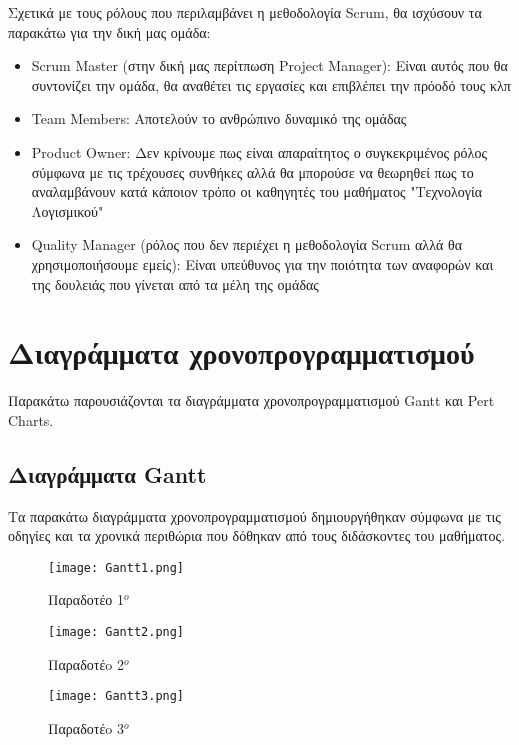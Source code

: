 \documentclass{article}
\begin{document}
Σχετικά με τους ρόλους που περιλαμβάνει η μεθοδολογία Scrum, θα ισχύσουν τα παρακάτω για την δική μας ομάδα:

\begin{itemize}
  \item Scrum Master (στην δική μας περίτπωση Project Manager): Είναι αυτός που θα συντονίζει την ομάδα, θα αναθέτει τις εργασίες και επιβλέπει την πρόοδό τους κλπ
  \item Team Members: Αποτελούν το ανθρώπινο δυναμικό της ομάδας
  \item Product Owner: Δεν κρίνουμε πως είναι απαραίτητος ο συγκεκριμένος ρόλος σύμφωνα με τις τρέχουσες συνθήκες αλλά θα μπορούσε να θεωρηθεί πως το αναλαμβάνουν κατά κάποιον τρόπο οι καθηγητές του μαθήματος "Τεχνολογία Λογισμικού"
  \item Quality Manager (ρόλος που δεν περιέχει η μεθοδολογία Scrum αλλά θα χρησιμοποιήσουμε εμείς): Είναι υπεύθυνος για την ποιότητα των αναφορών και της δουλειάς που γίνεται από τα μέλη της ομάδας
\end{itemize}

\section{Διαγράμματα χρονοπρογραμματισμού}

Παρακάτω παρουσιάζονται τα διαγράμματα χρονοπρογραμματισμού Gantt και Pert Charts.

\subsection{Διαγράμματα Gantt}

Τα παρακάτω διαγράμματα χρονοπρογραμματισμού δημιουργήθηκαν σύμφωνα με τις οδηγίες και τα χρονικά περιθώρια που δόθηκαν από τους διδάσκοντες του μαθήματος.

\vspace{0.3cm}

\begin{figure}[!htb]
\centering
\texttt{[image: Gantt1.png]}
\caption{\label{fig:Gantt1} Παραδοτέο 1$^o$}
\end{figure}

\newpage
 
\begin{figure}[!htb]
\centering
\texttt{[image: Gantt2.png]}
\caption{\label{fig:Gantt2} Παραδοτέo 2$^o$}
\end{figure}

\begin{figure}[!htb]
\centering
\texttt{[image: Gantt3.png]}
\caption{\label{fig:Gannt3} Παραδοτέo 3$^o$}
\end{figure}
\end{document}

